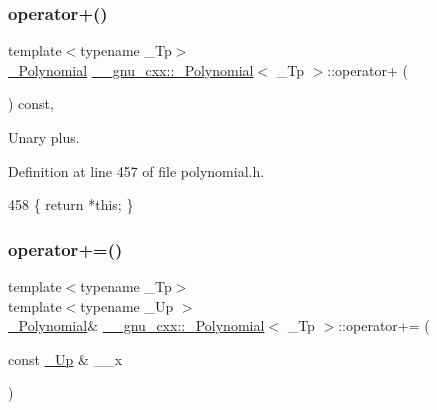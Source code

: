 \subsubsection{\texorpdfstring{operator+()}{operator+()}}
{\footnotesize\ttfamily template$<$typename \+\_\+\+Tp$>$ \\
\hyperlink{class____gnu__cxx_1_1__Polynomial}{\+\_\+\+Polynomial} \hyperlink{class____gnu__cxx_1_1__Polynomial}{\+\_\+\+\_\+gnu\+\_\+cxx\+::\+\_\+\+Polynomial}$<$ \+\_\+\+Tp $>$\+::operator+ (\begin{DoxyParamCaption}{ }\end{DoxyParamCaption}) const\hspace{0.3cm}{\ttfamily [inline]}, {\ttfamily [noexcept]}}

Unary plus. 

Definition at line 457 of file polynomial.\+h.


\begin{DoxyCode}
458       \{ \textcolor{keywordflow}{return} *\textcolor{keyword}{this}; \}
\end{DoxyCode}
\mbox{\label{class____gnu__cxx_1_1__Polynomial_a68658f4f4692cd8a840919123d03995a}} 
\subsubsection{\texorpdfstring{operator+=()}{operator+=()}\hspace{0.1cm}{\footnotesize\ttfamily [1/2]}}
{\footnotesize\ttfamily template$<$typename \+\_\+\+Tp$>$ \\
template$<$typename \+\_\+\+Up $>$ \\
\hyperlink{class____gnu__cxx_1_1__Polynomial}{\+\_\+\+Polynomial}\& \hyperlink{class____gnu__cxx_1_1__Polynomial}{\+\_\+\+\_\+gnu\+\_\+cxx\+::\+\_\+\+Polynomial}$<$ \+\_\+\+Tp $>$\+::operator+= (\begin{DoxyParamCaption}\item[{const \hyperlink{class____gnu__cxx_1_1__Polynomial_a242114d4b86648a5dff67a8221f80d40}{\+\_\+\+Up} \&}]{\+\_\+\+\_\+x }\end{DoxyParamCaption})\hspace{0.3cm}{\ttfamily [inline]}}

